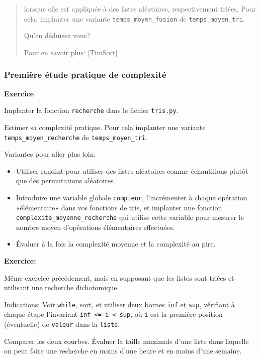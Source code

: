 \begin{quote}
lorsque elle est appliquée à des listes aléatoires, respectivement
triées. Pour cela, implanter une variante \texttt{temps\_moyen\_fusion}
de \texttt{temps\_moyen\_tri}.

Qu'en déduisez vous?

Pour en savoir plus: {[}TimSort{]}\_
\end{quote}

\subsubsection{Première étude pratique de complexité}

\textbf{Exercice}

Implanter la fonction \texttt{recherche} dans le fichier
\texttt{tris.py}.

Estimer sa complexité pratique. Pour cela implanter une variante
\texttt{temps\_moyen\_recherche} de \texttt{temps\_moyen\_tri}.

Variantes pour aller plus loin:

\begin{itemize}
\item
  Utiliser randint pour utiliser des listes aléatoires comme
  échantillons plutôt que des permutations aléatoires.
\item
  Introduire une variable globale \texttt{compteur}, l'incrémenter à
  chaque opération «élémentaire» dans vos fonctions de tris, et
  implanter une fonction \texttt{complexite\_moyenne\_recherche} qui
  utilise cette variable pour mesurer le nombre moyen d'opérations
  élémentaires effectuées.
\item
  Évaluer à la fois la complexité moyenne et la complexité au pire.
\end{itemize}

\textbf{Exercice:}

Même exercice précédement, mais en supposant que les listes sont triées
et utilisant une recherche dichotomique.

Indications: Voir \texttt{while}, sort, et utiliser deux bornes
\texttt{inf} et \texttt{sup}, vérifiant à chaque étape l'invariant
\texttt{inf \textless{}= i \textless{} sup}, où \texttt{i} est la
première position (éventuelle) de \texttt{valeur} dans la
\texttt{liste}.

Comparer les deux courbes. Évaluer la taille maximale d'une liste dans
laquelle on peut faire une recherche en moins d'une heure et en moins
d'une semaine.

